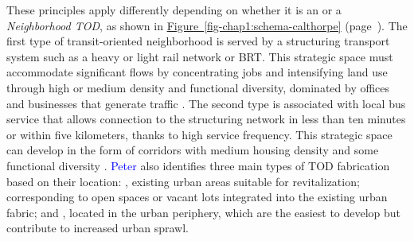 \begin{refsegment}
These principles apply differently depending on whether it is an  or a \textsl{Neighborhood \acrshort{TOD}}, as shown in \hyperref[fig-chap1:schema-calthorpe]{Figure~\ref{fig-chap1:schema-calthorpe}} (page~\pageref{fig-chap1:schema-calthorpe}). The first type of transit-oriented neighborhood is served by a structuring transport system such as a heavy or light rail network or \acrfull{BRT}. This strategic  space must accommodate significant flows by concentrating jobs and intensifying land use through high or medium density and functional diversity, dominated by offices and businesses that generate traffic \textcolor{blue}{\autocite[57]{calthorpe_next_1993}}. The second type is associated with local bus service that allows connection to the structuring network in less than ten minutes or within five kilometers, thanks to high service frequency. This strategic  space can develop in the form of corridors with medium housing density and some functional diversity \textcolor{blue}{\autocite[57]{calthorpe_next_1993}}. \textcolor{blue}{Peter} \textcolor{blue}{\textcite[50, 61]{calthorpe_next_1993}} also identifies three main types of \acrshort{TOD} fabrication based on their location: , existing urban areas suitable for revitalization;  corresponding to open spaces or vacant lots integrated into the existing urban fabric; and , located in the urban periphery, which are the easiest to develop but contribute to increased urban sprawl.%


\end{refsegment}
